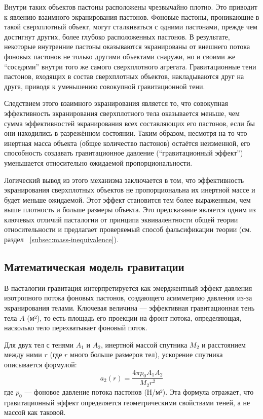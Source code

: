 \documentclass[pdflatex,sn-mathphys-num]{sn-jnl}
\begin{document}
Внутри таких объектов пастоны расположены чрезвычайно плотно. Это приводит к явлению взаимного экранирования пастонов. Фоновые пастоны, проникающие в такой сверхплотный объект, могут сталкиваться с одними пастонами, прежде чем достигнут других, более глубоко расположенных пастонов. В результате, некоторые внутренние пастоны оказываются экранированы от внешнего потока фоновых пастонов не только другими объектами снаружи, но и своими же ``соседями'' внутри того же самого сверхплотного агрегата. Гравитационные тени пастонов, входящих в состав сверхплотных объектов, накладываются друг на друга, приводя к уменьшению совокупной гравитационной тени.

Следствием этого взаимного экранирования является то, что совокупная эффективность экранирования сверхплотного тела оказывается меньше, чем сумма эффективностей экранирования всех составляющих его пастонов, если бы они находились в разрежённом состоянии. Таким образом, несмотря на то что инертная масса объекта (общее количество пастонов) остаётся неизменной, его способность создавать гравитационное давление (``гравитационный эффект'') уменьшается относительно ожидаемой пропорциональности.

Логический вывод из этого механизма заключается в том, что эффективность экранирования сверхплотных объектов не пропорциональна их инертной массе и будет меньше ожидаемой. Этот эффект становится тем более выраженным, чем выше плотность и больше размеры объекта. Это предсказание является одним из ключевых отличий пасталогии от принципа эквивалентности общей теории относительности и предлагает проверяемый способ фальсификации теории (см. раздел ~\ref{subsec:mass-inequivalence}).

\subsection{Математическая модель гравитации}\label{subsec:gravity-model}

В пасталогии гравитация интерпретируется как эмерджентный эффект давления изотропного потока фоновых пастонов, создающего асимметрию давления из-за экранирования телами. Ключевая величина --- эффективная гравитационная тень тела \( A \) (м²), то есть площадь его проекции на фронт потока, определяющая, насколько тело перехватывает фоновый поток.

Для двух тел с тенями \( A_1 \) и \( A_2 \), инертной массой спутника \( M_2 \) и расстоянием между ними \( r \) (где \( r \) много больше размеров тел), ускорение спутника описывается формулой:
\[
a_2(r) = \frac{4\pi p_0 A_1 A_2}{M_2 r^2}
\]
где \( p_0 \) --- фоновое давление потока пастонов (Н/м²). Эта формула отражает, что гравитационный эффект определяется геометрическими свойствами теней, а не массой как таковой.
\end{document}
